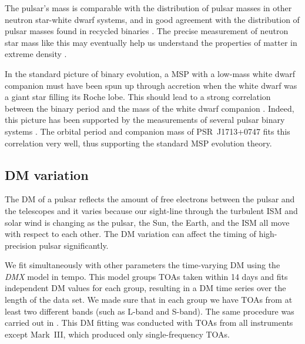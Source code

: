 The pulsar's mass is comparable with the distribution of pulsar masses
in other neutron star-white dwarf systems, and in good
agreement with the distribution of pulsar masses found in recycled binaries
\citep{opns12,kkdt13}. The precise measurement of neutron star mass like this
may eventually help us understand the properties of matter in extreme 
density \citep{lat12}.

In the standard picture of binary evolution, a MSP with a low-mass white dwarf companion must have been spun up through accretion when the white dwarf was a giant star filling its Roche lobe. 
This should lead to a strong correlation between the binary period and the mass of the white dwarf companion \citep{rpj+95, ts99a, prp02b}. 
Indeed, this picture has been supported by the measurements of several pulsar
binary systems \citep[e.g.,][]{vbb+01, ktr94, th14}.  
The orbital period and companion mass of PSR~J1713+0747 fits
this correlation very well, thus supporting the standard MSP evolution theory. %




\subsection{DM variation}
\label{sec:dmx}
The DM of a pulsar reflects the amount of free electrons between
the pulsar and the telescopes and it varies because
our sight-line through the turbulent ISM and solar wind is changing as the
pulsar, the Sun, the Earth, and the ISM all move with respect to each other.
The DM variation can affect the timing of high-precision pulsar significantly.

We fit simultaneously with other parameters the time-varying DM using the {\it DMX} model in {\sc tempo}.
This model groups TOAs taken within 14 days and fits independent DM values for each group, resulting in a DM time series over the length of the data set.
We made sure that in each group we have TOAs
from at least two different bands (such as L-band and S-band). 
The same procedure was carried out in
\citet{dfg+13}.  This DM fitting was conducted with TOAs from all
instruments except Mark~III, which produced only single-frequency TOAs.

